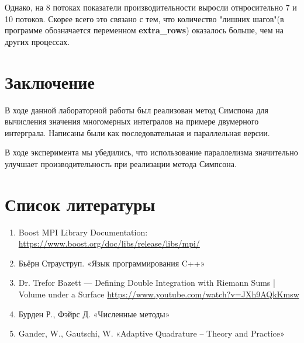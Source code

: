 \documentclass[12pt,a4paper]{article}
\begin{document}
Однако, на 8 потоках показатели производительности выросли отнросительно 7 и 10 потоков. Скорее всего это связано с тем, что количество "лишних шагов"(в программе обозначается переменном \textbf{extra\_rows}) оказалось больше, чем на других процессах.

\section*{Заключение}

В ходе данной лабораторной работы был реализован метод Симспона для вычисления значения многомерных интегралов на примере двумерного интерграла. Написаны были как последовательная и параллельная версии.

В ходе эксперимента мы убедились, что использование параллелизма значительно улучшает производительность при реализации метода Симпсона.

\newpage
\section*{Список литературы}


\begin{enumerate}
    \item Boost MPI Library Documentation: 
    \url{https://www.boost.org/doc/libs/release/libs/mpi/}
    \item Бьёрн Страуструп. «Язык программирования C++»
    \item Dr. Trefor Bazett --- Defining Double Integration with Riemann Sums | Volume under a Surface
    \url{https://www.youtube.com/watch?v=JXh9AQkKmsw}
    \item Бурден Р., Фэйрс Д. «Численные методы»
    \item Gander, W., Gautschi, W. «Adaptive Quadrature – Theory and Practice»
\end{enumerate}

\newpage
\end{document}

